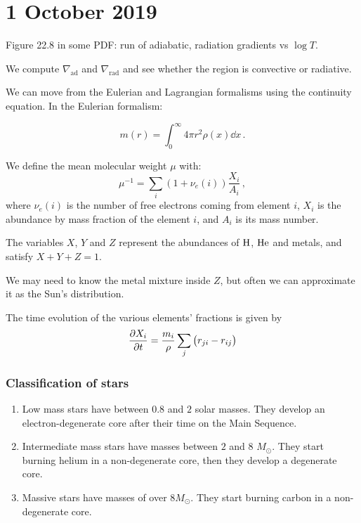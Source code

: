 \documentclass[main.tex]{subfiles}
\begin{document}
\section*{1 October 2019}

Figure 22.8 in some PDF: run of adiabatic, radiation gradients vs \(\log T \).

We compute \(\nabla_{\text{ad}}\) and \(\nabla_{\text{rad}}\) and see whether the region is convective or radiative.

We can move from the Eulerian and Lagrangian formalisms using the continuity equation. In the Eulerian formalism:

\begin{equation}
  m(r) = \int_0^\infty 4 \pi r^2 \rho(x) \dd{x} \,.
\end{equation}

We define the mean molecular weight \(\mu \) with:
%
\begin{equation}
  \mu^{-1} = \sum _{i}  (1 + \nu_e (i)) \frac{X_i}{A_i}
\,,
\end{equation}
where \(\nu_{e} (i)\) is the number of free electrons coming from element \(i\), \(X_{i}\) is the abundance by mass fraction of the element \(i\), and \(A_{i}\) is its mass number. 

The variables \(X\), \(Y\) and \(Z\) represent the abundances of \(\ce{H}\), \(\ce{He}\) and metals, and satisfy \(X+Y+Z=1\).

We may need to know the metal mixture inside \(Z\), but often we can approximate it as the Sun's distribution.

The time evolution of the various elements' fractions is given by
%
\begin{equation}
  \pdv{X_i}{t} = \frac{m_i}{\rho} \sum _j \qty( r_{ji} - r_{ij})
\end{equation}

\subsubsection{Classification of stars}

\begin{enumerate}
  \item Low mass stars have between \(0.8\) and \(2\) solar masses. They develop an electron-degenerate core after their time on the Main Sequence. 
  \item Intermediate mass stars have masses between \(2\) and \(8\) \(M_{\odot}\). They start burning helium in a non-degenerate core, then they develop a degenerate  core. 
  \item Massive stars have masses of over \(8 M_{\odot}\). They start burning carbon in a non-degenerate core. 
\end{enumerate}
\end{document}
